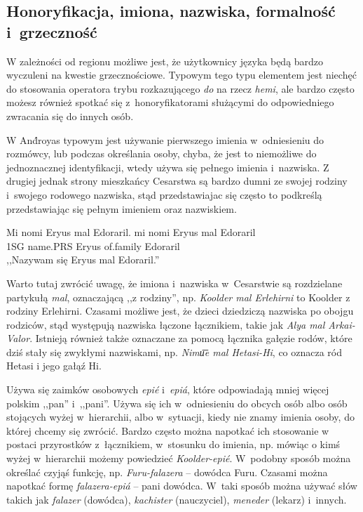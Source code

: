 \begin{spacing}{1.1}
\subsection{Honoryfikacja, imiona, nazwiska, formalność i~grzeczność}

W zależności od regionu możliwe jest, że użytkownicy języka będą bardzo
wyczuleni na kwestie grzecznościowe. Typowym tego typu elementem jest niechęć do
stosowania operatora trybu rozkazującego \emph{do} na rzecz \emph{hemi}, ale
bardzo często możesz również spotkać się z~honoryfikatorami służącymi do
odpowiedniego zwracania się do innych osób.

W And́royas typowym jest używanie pierwszego imienia w~odniesieniu do rozmówcy,
lub podczas określania osoby, chyba, że jest to niemożliwe do jednoznacznej
identyfikacji, wtedy używa się pełnego imienia i~nazwiska. Z drugiej jednak
strony mieszkańcy Cesarstwa są bardzo dumni ze swojej rodziny i~swojego rodowego
nazwiska, stąd przedstawiajac się często to podkreślą przedstawiając się pełnym
imieniem oraz nazwiskiem.

\begin{exe}
	\ex
	\trans Mi nomi Eryus mal Edoraril.
	\gll mi nomi Eryus mal Edoraril\\
	  1SG name.PRS Eryus of.family Edoraril\\
	\glt  ,,Nazywam się Eryus mal Edoraril.''
\end{exe}

Warto tutaj zwrócić uwagę, że imiona i~nazwiska w~Cesarstwie są rozdzielane
partykułą \emph{mal}, oznaczającą ,,z rodziny'', np. \emph{Koolder mal
Erlehirni} to Koolder z rodziny Erlehirni. Czasami możliwe jest, że dzieci
dziedziczą nazwiska po obojgu rodziców, stąd występują nazwiska łączone
łącznikiem, takie jak \emph{Alya mal Arkai-Valor}. Istnieją również także
oznaczane za pomocą łącznika gałęzie rodów, które dziś stały się zwykłymi
nazwiskami, np. \emph{Nimu͞e mal Hetasi-Hi}, co oznacza ród Hetasi i jego gałąź
Hi.

\skipline

Używa się zaimków osobowych \emph{epié} i~\emph{epiá}, które odpowiadają mniej
więcej polskim ,,pan'' i~,,pani''. Używa się ich w~odniesieniu do obcych osób
albo osób stojących wyżej w~hierarchii, albo w~sytuacji, kiedy nie znamy imienia
osoby, do której chcemy się zwrócić. Bardzo często można napotkać ich stosowanie
w postaci przyrostków z~łącznikiem, w~stosunku do imienia, np. mówiąc o kimś
wyżej w~hierarchii możemy powiedzieć \emph{Koolder-epié}. W~podobny sposób
można określać czyjąś funkcję, np. \emph{Furu-falazera} -- dowódca Furu. Czasami
można napotkać formę \emph{falazera-epiá} -- pani dowódca. W~taki sposób można
używać słów takich jak \emph{falazer} (dowódca), \emph{kachister} (nauczyciel),
\emph{meneder} (lekarz) i~innych.


\end{spacing}
